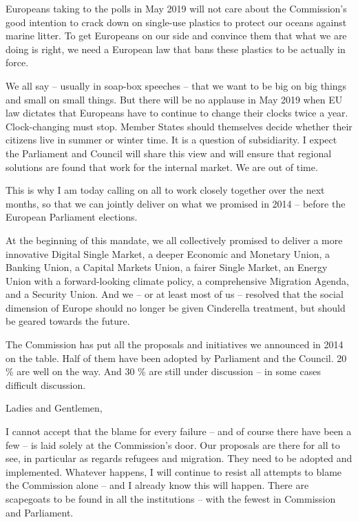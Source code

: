\documentclass[a4paper,11pt]{article}
\begin{document}
Europeans taking to the polls in May 2019 will not care about the Commission's good intention to crack down on single-use plastics to protect our oceans against marine litter. To get Europeans on our side and convince them that what we are doing is right, we need a European law that bans these plastics to be actually in force.

We all say – usually in soap-box speeches – that we want to be big on big things and small on small things. But there will be no applause in May 2019 when EU law dictates that Europeans have to continue to change their clocks twice a year. Clock-changing must stop. Member States should themselves decide whether their citizens live in summer or winter time. It is a question of subsidiarity. I expect the Parliament and Council will share this view and will ensure that regional solutions are found that work for the internal market. We are out of time.

This is why I am today calling on all to work closely together over the next months, so that we can jointly deliver on what we promised in 2014 – before the European Parliament elections.

At the beginning of this mandate, we all collectively promised to deliver a more innovative Digital Single Market, a deeper Economic and Monetary Union, a Banking Union, a Capital Markets Union, a fairer Single Market, an Energy Union with a forward-looking climate policy, a comprehensive Migration Agenda, and a Security Union. And we – or at least most of us – resolved that the social dimension of Europe should no longer be given Cinderella treatment, but should be geared towards the future.

The Commission has put all the proposals and initiatives we announced in 2014 on the table. Half of them have been adopted by Parliament and the Council. 20 \% are well on the way. And 30 \% are still under discussion – in some cases difficult discussion.

Ladies and Gentlemen,

I cannot accept that the blame for every failure – and of course there have been a few – is laid solely at the Commission's door. Our proposals are there for all to see, in particular as regards refugees and migration. They need to be adopted and implemented. Whatever happens, I will continue to resist all attempts to blame the Commission alone – and I already know this will happen. There are scapegoats to be found in all the institutions – with the fewest in Commission and Parliament.
\end{document}
